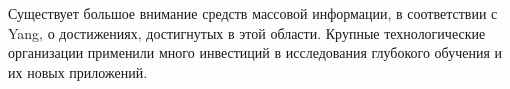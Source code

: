 \begin{frame}

    Существует большое внимание средств массовой информации,
    в соответствии с Yang, о достижениях, достигнутых в этой области.
    Крупные технологические организации применили много инвестиций
    в исследования глубокого обучения и их новых приложений.

\end{frame}